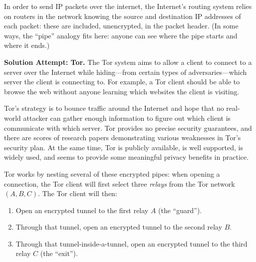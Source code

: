 \documentclass[
  letterpaper,
]{scrbook}
\providecommand{\tightlist}{%
  \setlength{\itemsep}{0pt}\setlength{\parskip}{0pt}}
\theoremstyle{definition}
\theoremstyle{plain}
\theoremstyle{plain}
\theoremstyle{remark}
\begin{document}
In order to send IP packets over the internet, the Internet's routing
system relies on routers in the network knowing the source and
destination IP addresses of each packet: these are included,
unencrypted, in the packet header. (In some ways, the ``pipe'' analogy
fits here: anyone can see where the pipe starts and where it ends.)

\textbf{Solution Attempt: Tor.} The Tor system aims to allow a client to
connect to a server over the Internet while hiding---from certain types
of adversaries---which server the client is connecting to. For example,
a Tor client should be able to browse the web without anyone learning
which websites the client is visiting.

Tor's strategy is to bounce traffic around the Internet and hope that no
real-world attacker can gather enough information to figure out which
client is communicate with which server. Tor provides no precise
security guarantees, and there are scores of research papers
demonstrating various weaknesses in Tor's security plan. At the same
time, Tor is publicly available, is well supported, is widely used, and
seems to provide some meaningful privacy benefits in practice.


Tor works by nesting several of these encrypted pipes: when opening a
connection, the Tor client will first select three \emph{relays} from
the Tor network \((A, B, C)\). The Tor client will then:

\begin{enumerate}
\def\labelenumi{\arabic{enumi}.}
\tightlist
\item
  Open an encrypted tunnel to the first relay \(A\) (the ``guard'').
\item
  Through that tunnel, open an encrypted tunnel to the second relay
  \(B\).
\item
  Through that tunnel-inside-a-tunnel, open an encrypted tunnel to the
  third relay \(C\) (the ``exit'').
\end{enumerate}
\end{document}
